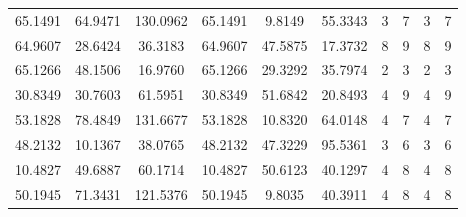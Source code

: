 \documentclass[withoutpreface,bwprint]{cumcmthesis} %
\begin{document}
\begin{appendices}
\begin{table}[htbp!]
\begin{tabular}{@{}cccccccccc@{}}
							65.1491                          & 64.9471                          & 130.0962                         & 65.1491                          & 9.8149                           & 55.3343                          & 3                    & 7                    & 3                      & 7                      \\
							64.9607                          & 28.6424                          & 36.3183                          & 64.9607                          & 47.5875                          & 17.3732                          & 8                    & 9                    & 8                      & 9                      \\
							65.1266                          & 48.1506                          & 16.9760                          & 65.1266                          & 29.3292                          & 35.7974                          & 2                    & 3                    & 2                      & 3                      \\
							30.8349                          & 30.7603                          & 61.5951                          & 30.8349                          & 51.6842                          & 20.8493                          & 4                    & 9                    & 4                      & 9                      \\
							53.1828                          & 78.4849                          & 131.6677                         & 53.1828                          & 10.8320                          & 64.0148                          & 4                    & 7                    & 4                      & 7                      \\
							48.2132                          & 10.1367                          & 38.0765                          & 48.2132                          & 47.3229                          & 95.5361                          & 3                    & 6                    & 3                      & 6                      \\
							10.4827                          & 49.6887                          & 60.1714                          & 10.4827                          & 50.6123                          & 40.1297                          & 4                    & 8                    & 4                      & 8                      \\
							50.1945                          & 71.3431                          & 121.5376                         & 50.1945                          & 9.8035                           & 40.3911                          & 4                    & 8                    & 4                      & 8                      \\

\end{tabular}
\end{table}
\end{appendices}
\end{document}
